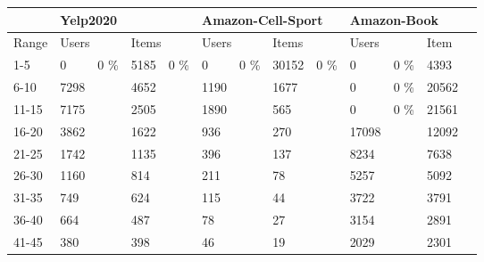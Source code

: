 \begin{table*}[]
    \begin{tabular}{|l|l|l|l|l|l|l|l|l|l|l|l|l|}
    \hline
            & \multicolumn{4}{l|}{Yelp2020}                           & \multicolumn{4}{l|}{Amazon-Cell-Sport}                  & \multicolumn{4}{l|}{Amazon-Book}                       \\ \hline
    Range   & \multicolumn{2}{l|}{Users} & \multicolumn{2}{l|}{Items} & \multicolumn{2}{l|}{Users} & \multicolumn{2}{l|}{Items} & \multicolumn{2}{l|}{Users} & \multicolumn{2}{l|}{Item} \\ \hline
    1-5     & 0            & 0 \%        & 5185         & 0 \%        & 0            & 0 \%        & 30152        & 0 \%        & 0             & 0 \%       & 4393           &          \\ \hline
    6-10    & 7298         &             & 4652         &             & 1190         &             & 1677         &             & 0             & 0 \%       & 20562          &          \\ \hline
    11-15   & 7175         &             & 2505         &             & 1890         &             & 565          &             & 0             & 0 \%       & 21561          &          \\ \hline
    16-20   & 3862         &             & 1622         &             & 936          &             & 270          &             & 17098         &            & 12092          &          \\ \hline
    21-25   & 1742         &             & 1135         &             & 396          &             & 137          &             & 8234          &            & 7638           &          \\ \hline
    26-30   & 1160         &             & 814          &             & 211          &             & 78           &             & 5257          &            & 5092           &          \\ \hline
    31-35   & 749          &             & 624          &             & 115          &             & 44           &             & 3722          &            & 3791           &          \\ \hline
    36-40   & 664          &             & 487          &             & 78           &             & 27           &             & 3154          &            & 2891           &          \\ \hline
    41-45   & 380          &             & 398          &             & 46           &             & 19           &             & 2029          &            & 2301           &          \\ \hline

\end{tabular}
\end{table*}
